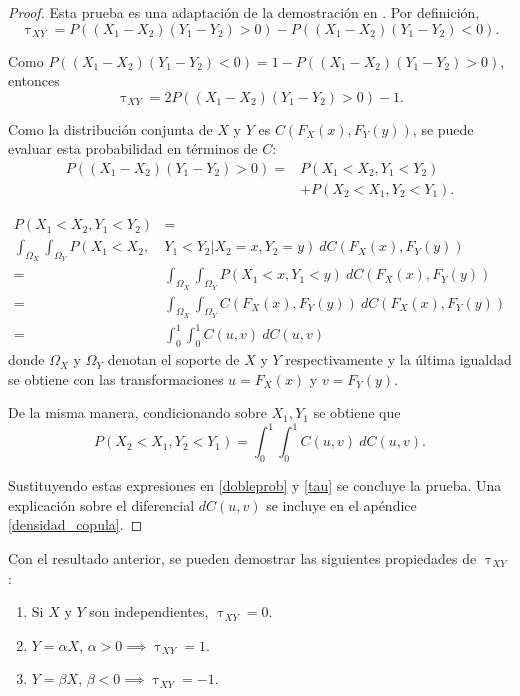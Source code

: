 \documentclass[11pt,a4paper]{article}
\begin{document}
\begin{proof} Esta prueba es una adaptación de la demostración en \citet{nelsen}.
Por definición, $$\uptau_{XY} = P\left((X_1-X_2)(Y_1-Y_2) > 0\right) - P\left((X_1-X_2)(Y_1-Y_2) < 0\right).$$

Como $P\left((X_1-X_2)(Y_1-Y_2) < 0\right) = 1-P\left((X_1-X_2)(Y_1-Y_2) > 0\right)$, entonces
\begin{equation} \label{tau}
\uptau_{XY} = 2P\left((X_1-X_2)(Y_1-Y_2) > 0\right) - 1.
\end{equation}

Como la distribución conjunta de $X$ y $Y$ es $C(F_X(x), F_Y(y))$, se puede evaluar esta probabilidad en términos de $C$:
\begin{align}  \label{dobleprob}
P\left((X_1-X_2)(Y_1-Y_2) > 0\right) = &P\left(X_1<X_2, Y_1<Y_2\right) \nonumber \\
&+ P\left(X_2<X_1, Y_2<Y_1\right).
\end{align}

\begin{align*}
P\left(X_1 < X_2, Y_1 < Y_2\right) &=\\
\int_{\Omega_X} \int_{\Omega_Y} P\left(X_1 < X_2, \right. & \left. Y_1 < Y_2 | X_2 = x, Y_2 = y\right) \ dC(F_X(x), F_Y(y))\\
= &\int_{\Omega_X} \int_{\Omega_Y} P\left(X_1 < x, Y_1 < y\right) \ dC(F_X(x), F_Y(y))\\
= &\int_{\Omega_X} \int_{\Omega_Y} C(F_X(x), F_Y(y)) \ dC(F_X(x), F_Y(y))\\
= &\int_0^1 \int_0^1 C(u, v) \ dC(u, v)
\end{align*}
donde $\Omega_X$ y $\Omega_Y$ denotan el soporte de $X$ y $Y$ respectivamente y la última igualdad se obtiene con las transformaciones $u = F_X(x)$ y $v = F_Y(y)$.

De la misma manera, condicionando sobre $X_1, Y_1$ se obtiene que $$P\left(X_2 < X_1, Y_2 < Y_1\right) = \int_0^1 \int_0^1 C(u, v) \ dC(u, v).$$

Sustituyendo estas expresiones en \eqref{dobleprob} y \eqref{tau} se concluye la prueba. Una explicación sobre el diferencial $dC(u, v)$ se incluye en el apéndice \ref{densidad_copula}.
\end{proof}

Con el resultado anterior, se pueden demostrar las siguientes propiedades de $\uptau_{XY}$ \citep{nelsen}:

\begin{enumerate}
\item Si $X$ y $Y$ son independientes, $\uptau_{XY} = 0$.
\item $Y = \alpha X$, $\alpha > 0 \implies \uptau_{XY} = 1$.
\item $Y = \beta X$, $\beta < 0 \implies \uptau_{XY} = -1$.
\end{enumerate}
\end{document}
